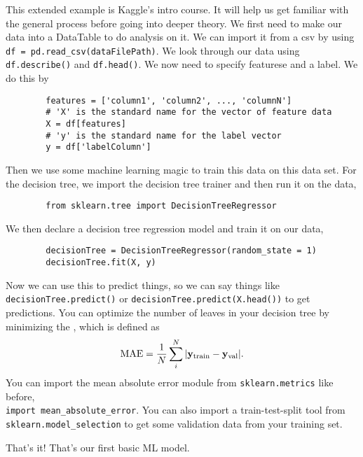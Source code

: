 \documentclass[11pt]{article}
\begin{document}
\begin{eexample}
    This extended example is Kaggle's intro course. It will help us get familiar
    with the general process before going into deeper theory.
    We first need to make our data into a DataTable to do analysis on it.
    We can import it from a csv by using \verb|df = pd.read_csv(dataFilePath)|.
    We look through our data using \verb|df.describe()| and \verb|df.head()|.
    We now need to specify featurese and a label. We do this by
    \begin{verbatim}
        features = ['column1', 'column2', ..., 'columnN']
        # 'X' is the standard name for the vector of feature data
        X = df[features]
        # 'y' is the standard name for the label vector
        y = df['labelColumn']
    \end{verbatim}
    Then we use some machine learning magic to train this data on this data set.
    For the decision tree, we import the decision tree trainer and then run it on the
    data,
    \begin{verbatim}
        from sklearn.tree import DecisionTreeRegressor
    \end{verbatim}
    We then declare a decision tree regression model and train it
    on our data,
    \begin{verbatim}
        decisionTree = DecisionTreeRegressor(random_state = 1)
        decisionTree.fit(X, y)
    \end{verbatim}
    Now we can use this to predict things, so we can say things
    like \verb|decisionTree.predict()| or \verb|decisionTree.predict(X.head())|
    to get predictions. You can optimize the number of leaves in your
    decision tree by minimizing the ,
    which is defined as
    \begin{align*}
        {\rm MAE} = \frac{1}{N} \sum_i^N |\mathbf{y}_{\rm train} - \mathbf{y}_{\rm val}|.
    \end{align*}
    You can import the mean absolute error module from \verb|sklearn.metrics|
    like before,\\ \verb|import mean_absolute_error|.
    You can also import a train-test-split tool from\\
    \verb|sklearn.model_selection|
    to get some validation data from your training set.
\end{eexample}

That's it! That's our first basic ML model.
\end{document}
